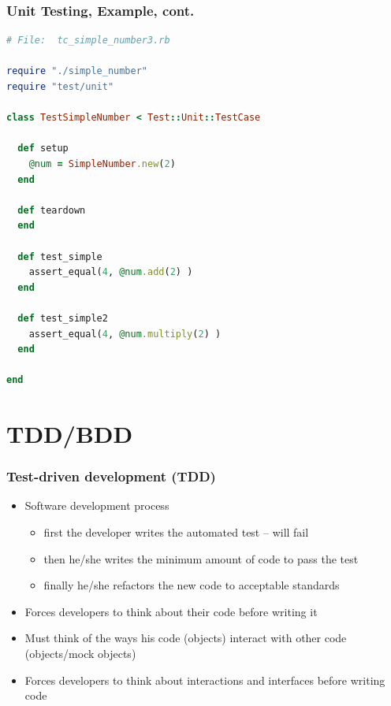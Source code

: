 \documentclass{beamer}
\begin{document}
\begin{frame}[fragile]\frametitle{Unit Testing, Example, cont.} 
  \begin{lstlisting}[language=ruby, escapechar={^}]
# File:  tc_simple_number3.rb
 
require "./simple_number"
require "test/unit"
 
class TestSimpleNumber < Test::Unit::TestCase
 
  def setup
    @num = SimpleNumber.new(2)
  end
 
  def teardown
  end
 
  def test_simple
    assert_equal(4, @num.add(2) )
  end
 
  def test_simple2
    assert_equal(4, @num.multiply(2) )
  end
 
end
  \end{lstlisting}
\end{frame}



\section{TDD/BDD}
\begin{frame}[fragile]\frametitle{Test-driven development (TDD)} 
  \begin{itemize}
    \item Software development process
    \begin{itemize}
      \item first the developer writes the automated test -- will fail
      \item then he/she writes the minimum amount of code to pass the test
      \item finally he/she refactors the new code to acceptable standards
    \end{itemize}
    
    \item Forces developers to think about their code before writing it
    \item Must think of the ways his code (objects) interact with other code (objects/mock objects)
    \item Forces developers to think about interactions and interfaces before writing code
  \end{itemize}
\end{frame}
\end{document}
